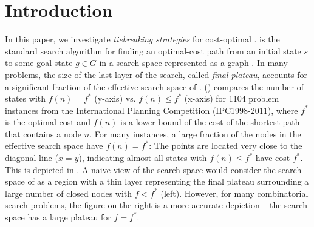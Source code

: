 
\section{Introduction}
\label{sec:introduction}

In this paper, we investigate \emph{tiebreaking strategies} for cost-optimal \astar.
\astar is the standard search
algorithm for finding an optimal-cost path from an initial state $s$ to
some goal state $g \in G$ in a search space represented as a graph
\cite{hart1968formal}.
In many problems, the size of the last layer of the search, called
\emph{final plateau}, accounts for a significant fraction of the
effective search space of \astar.  
() compares the number of states with $f(n) = f^*$
(y-axis) vs. $f(n) \leq f^*$ (x-axis) for 1104 problem
instances from the International Planning Competition (IPC1998-2011),
where $f^*$ is the optimal cost and $f(n)$ is a lower bound of the cost of the shortest path
that contains a node $n$.  For many instances, a large
fraction of the nodes in the effective search space have $f(n)=f^*$:
The points are located very close to the diagonal line
($x=y$), indicating almost all states with $f(n) \leq f^*$ have cost $f^*$.
This is depicted in . 
A naive view of the search space would consider the search space of \astar as a region with a thin layer representing the  final plateau surrounding a large number of closed nodes with $f<f^*$ (left).
However, for many combinatorial search problems, 
the figure on the right is a more accurate depiction -- the  search space has a large plateau 
for $f=f^*$.

